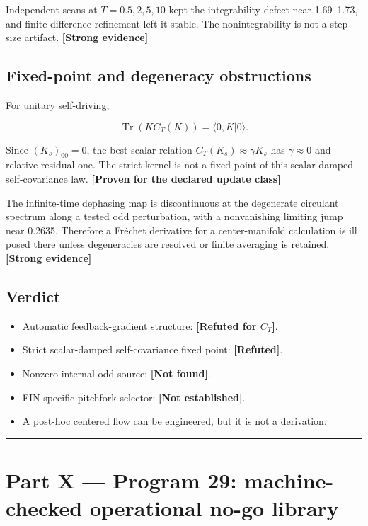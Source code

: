 \documentclass[11pt,a4paper,openany]{report}
\newcommand{\statusStrong}{\textcolor{finblue}{[Strong evidence]}}
\newcommand{\statusRefuted}{\textcolor{finred}{[Refuted]}}
\begin{document}
Independent scans at \(T=0.5,2,5,10\) kept the integrability defect near 1.69–1.73, and finite-difference refinement left it stable. The nonintegrability is not a step-size artifact. \textbf{\statusStrong{}}

\section{Fixed-point and degeneracy obstructions}

For unitary self-driving,

\[
\operatorname{Tr}(K C_T(K))
=\langle0,K|0\rangle.
\]

Since \((K_s)_{00}=0\), the best scalar relation \(C_T(K_s)\approx\gamma K_s\) has \(\gamma\approx0\) and relative residual one. The strict kernel is not a fixed point of this scalar-damped self-covariance law. \textbf{[Proven for the declared update class]}

The infinite-time dephasing map is discontinuous at the degenerate circulant spectrum along a tested odd perturbation, with a nonvanishing limiting jump near 0.2635. Therefore a Fréchet derivative for a center-manifold calculation is ill posed there unless degeneracies are resolved or finite averaging is retained. \textbf{\statusStrong{}}

\section{Verdict}

\begin{itemize}
\item 
Automatic feedback-gradient structure: \textbf{[Refuted for \(C_T\)]}.

\item 
Strict scalar-damped self-covariance fixed point: \textbf{\statusRefuted{}}.

\item 
Nonzero internal odd source: \textbf{[Not found]}.

\item 
FIN-specific pitchfork selector: \textbf{[Not established]}.

\item 
A post-hoc centered flow can be engineered, but it is not a derivation.

\end{itemize}

\par\medskip\hrule\medskip

\chapter{Part X — Program 29: machine-checked operational no-go library}
\end{document}
